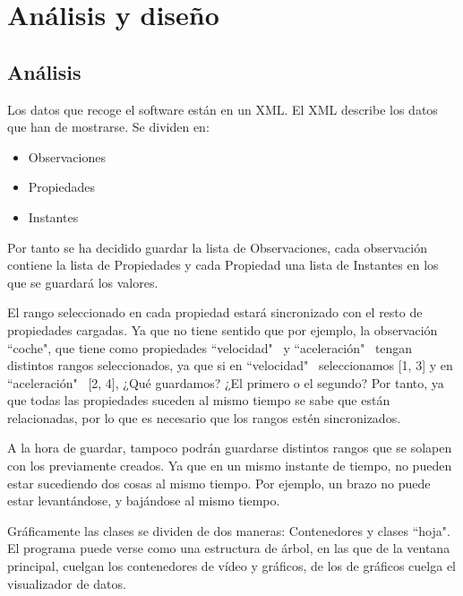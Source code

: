 \chapter{An\'{a}lisis y dise\~{n}o}


\section{An\'{a}lisis}
Los datos que recoge el software est\'an en un XML. El XML describe los datos que han de mostrarse. Se dividen en:
\begin{itemize}
	\item Observaciones
	\item Propiedades
	\item Instantes
\end{itemize}

Por tanto se ha decidido guardar la lista de Observaciones, cada observaci\'on contiene la lista de Propiedades 
y cada Propiedad una lista de Instantes en los que se guardar\'a los valores.

El rango seleccionado en cada propiedad estar\'a sincronizado con el resto de propiedades cargadas. 
Ya que no tiene sentido que por ejemplo, la observaci\'on ``coche", 
que tiene como propiedades ``velocidad" \ y ``aceleraci\'on" \ tengan distintos rangos 
seleccionados, ya que si en ``velocidad" \ seleccionamos [1, 3] y en ``aceleraci\'on" \ [2, 4], 
¿Qu\'e guardamos? ¿El primero o el segundo? Por tanto, ya que todas las propiedades suceden al
mismo tiempo se sabe que est\'an relacionadas, por lo que es necesario que los rangos est\'en
sincronizados.

A la hora de guardar, tampoco podr\'an guardarse distintos rangos que se solapen con los
previamente creados. Ya que en un mismo instante de tiempo, no pueden estar sucediendo dos cosas al mismo tiempo.
Por ejemplo, un brazo no puede estar levant\'andose, y baj\'andose al mismo tiempo.

Gr\'aficamente las clases se dividen de dos maneras: Contenedores y clases ``hoja".
El programa puede verse como una estructura de \'arbol, en las que de la ventana principal,
cuelgan los contenedores de v\'ideo y gr\'aficos, de los de gr\'aficos cuelga el 
visualizador de datos.

